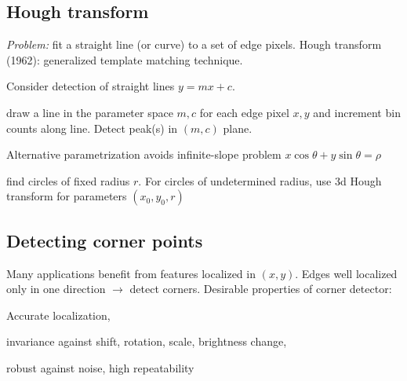 \subsection{Hough transform}
\emph{Problem:} fit a straight line (or curve) to a set of edge pixels. Hough transform (1962): generalized template matching technique. 
\begin{inparaenum}[\itshape(1)]
	\item Consider detection of straight lines $y=mx+c$.
	\item draw a line in the parameter space $m,c$ for each edge pixel $x,y$ and increment bin counts along line. Detect peak(s) in $(m,c)$ plane.
	\item Alternative parametrization avoids infinite-slope problem $x\cos\theta+y\sin\theta=\rho$
\end{inparaenum}
\begin{compactdesc}
	\item[\lp{circle detection}] find circles of fixed radius $r$. For circles of undetermined radius, use 3d Hough transform for parameters $(x_0,y_0,r)$
\end{compactdesc}
\subsection{Detecting corner points}
Many applications benefit from features localized in $(x,y)$. Edges well localized only in one direction $\to$ detect corners. Desirable properties of corner detector:
\begin{inparaenum}[\itshape(1)]
	\item Accurate localization,
	\item	invariance against shift, rotation, scale, brightness change, 
	\item robust against noise, high repeatability
\end{inparaenum}
